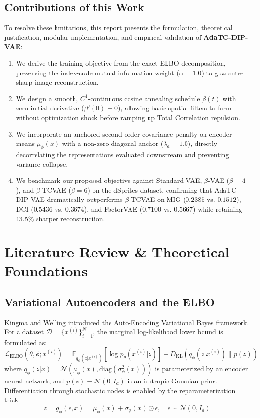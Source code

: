 \documentclass[11pt,a4paper]{article}
\begin{document}
\subsection{Contributions of this Work}
To resolve these limitations, this report presents the formulation, theoretical justification, modular implementation, and empirical validation of \textbf{AdaTC-DIP-VAE}:
\begin{enumerate}
    \item We derive the training objective from the exact ELBO decomposition, preserving the index-code mutual information weight ($\alpha = 1.0$) to guarantee sharp image reconstruction.
    \item We design a smooth, $C^1$-continuous cosine annealing schedule $\beta(t)$ with zero initial derivative ($\beta'(0) = 0$), allowing basic spatial filters to form without optimization shock before ramping up Total Correlation repulsion.
    \item We incorporate an anchored second-order covariance penalty on encoder means $\mu_\phi(x)$ with a non-zero diagonal anchor ($\lambda_d = 1.0$), directly decorrelating the representations evaluated downstream and preventing variance collapse.
    \item We benchmark our proposed objective against Standard VAE, $\beta$-VAE ($\beta=4$), and $\beta$-TCVAE ($\beta=6$) on the dSprites dataset, confirming that AdaTC-DIP-VAE dramatically outperforms $\beta$-TCVAE on MIG ($0.2385$ vs. $0.1512$), DCI ($0.5436$ vs. $0.3674$), and FactorVAE ($0.7100$ vs. $0.5667$) while retaining 13.5\% sharper reconstruction.
\end{enumerate}

\section{Literature Review \& Theoretical Foundations}

\subsection{Variational Autoencoders and the ELBO}
Kingma and Welling \cite{kingma2013auto} introduced the Auto-Encoding Variational Bayes framework. For a dataset $\mathcal{D} = \{x^{(i)}\}_{i=1}^N$, the marginal log-likelihood lower bound is formulated as:
\begin{equation}
\mathcal{L}_{\text{ELBO}}(\theta, \phi; x^{(i)}) = \mathbb{E}_{q_\phi(z|x^{(i)})}[\log p_\theta(x^{(i)}|z)] - D_{\text{KL}}(q_\phi(z|x^{(i)}) \parallel p(z))
\label{eq:elbo}
\end{equation}
where $q_\phi(z|x) = \mathcal{N}(\mu_\phi(x), \text{diag}(\sigma_\phi^2(x)))$ is parameterized by an encoder neural network, and $p(z) = \mathcal{N}(0, I_d)$ is an isotropic Gaussian prior. Differentiation through stochastic nodes is enabled by the reparameterization trick:
\begin{equation}
z = g_\phi(\epsilon, x) = \mu_\phi(x) + \sigma_\phi(x) \odot \epsilon, \quad \epsilon \sim \mathcal{N}(0, I_d)
\label{eq:reparam}
\end{equation}
\end{document}
